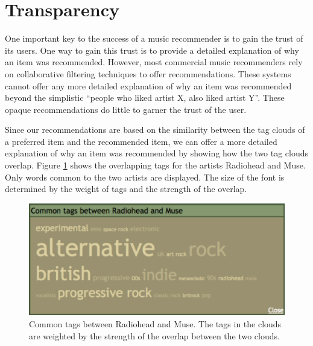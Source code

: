 \documentclass{article}
\begin{document}
\section{Transparency}
One important key to the success  of a music recommender is to gain the
trust of its users.  One way to gain this trust is to provide
a detailed explanation of why an item was recommended. However,
most commercial music recommenders rely on collaborative filtering
techniques to offer recommendations.  These systems cannot offer
any more detailed explanation of why an item was recommended beyond
the simplistic ``people who liked artist X, also liked artist Y''.
These opaque recommendations do little to garner the  trust of the user.

Since our recommendations are based on the similarity between  the tag clouds
of a preferred item and the recommended item, we can
offer a more detailed explanation of why an item was recommended
by showing how the two tag clouds overlap. Figure \ref{fig:commontags} shows
the overlapping tags for the artists Radiohead and Muse.
Only words common to the two artists are displayed. The size of the
font is determined by the weight of tags and the strength of the
overlap.

\begin{figure}[ht]
\begin{center}
\includegraphics[width=1.0\columnwidth]{radiohead-muse-commontags}
\end{center}
\caption{Common tags between Radiohead and Muse. 
The tags in the 
clouds are weighted by the strength of the overlap between the two clouds.}
\label{fig:commontags}
\end{figure}
\end{document}
